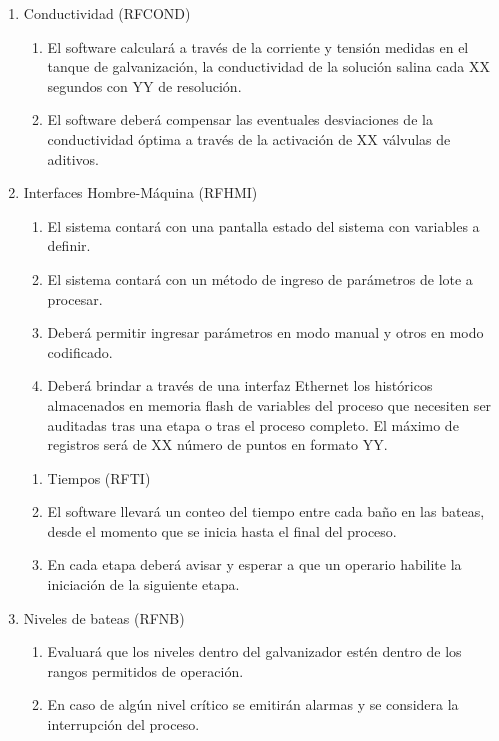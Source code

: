 \begin{enumerate}
\begin{enumerate}
\item Conductividad (RFCOND)
\begin{enumerate}
\item El software calculará a través de la corriente y tensión medidas en el tanque de galvanización, la conductividad de la solución salina cada XX segundos con YY de resolución.
\item El software deberá compensar las eventuales desviaciones de la conductividad óptima a través de la activación de XX válvulas de aditivos.
\end{enumerate}

\item Interfaces Hombre-Máquina (RFHMI)
\begin{enumerate}
\item El sistema contará con una pantalla estado del sistema con variables a definir.
\item El sistema contará con un método de ingreso de parámetros de lote a procesar.
\item Deberá permitir ingresar parámetros en modo manual y otros en modo codificado.
\item Deberá brindar a través de una interfaz Ethernet los históricos almacenados en memoria flash de variables del proceso que necesiten ser auditadas tras una etapa o tras el proceso completo. El máximo de registros será de XX número de puntos en formato YY.
\end{enumerate}

\begin{enumerate}
\item Tiempos (RFTI)
\item El software llevará un conteo del tiempo entre cada baño en las bateas, desde el momento que se inicia hasta el final del proceso.
\item En cada etapa deberá avisar y esperar a que un operario habilite la iniciación de la siguiente etapa.
\end{enumerate}

\item Niveles de bateas (RFNB)	
\begin{enumerate}
\item Evaluará que los niveles dentro del galvanizador estén dentro de los rangos permitidos de operación.
\item En caso de algún nivel crítico se emitirán alarmas y se considera la interrupción del proceso.
\end{enumerate}
\end{enumerate}


\end{enumerate}
